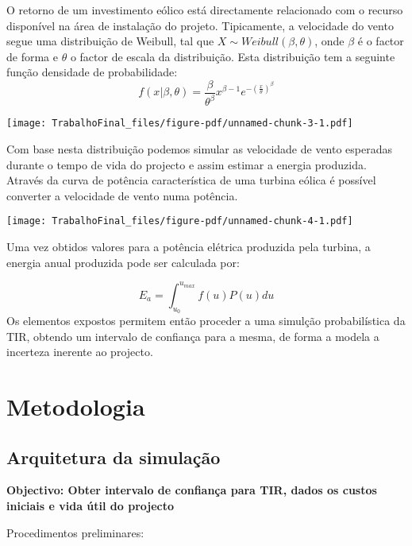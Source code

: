 \documentclass[
  letterpaper,
  DIV=11,
  numbers=noendperiod]{scrartcl}
\begin{document}
O retorno de um investimento eólico está directamente relacionado com o
recurso disponível na área de instalação do projeto. Tipicamente, a
velocidade do vento segue uma distribuição de Weibull, tal que
\(X \sim Weibull(\beta, \theta)\), onde \(\beta\) é o factor de forma e
\(\theta\) o factor de escala da distribuição. Esta distribuição tem a
seguinte função densidade de probabilidade: \[
f(x|{\beta, \theta}) = \frac{\beta}{\theta^\beta}x^{\beta-1}e^{-(\frac{x}{\theta})^\beta}
\]

\texttt{[image: TrabalhoFinal\_files/figure-pdf/unnamed-chunk-3-1.pdf]}

Com base nesta distribuição podemos simular as velocidade de vento
esperadas durante o tempo de vida do projecto e assim estimar a energia
produzida. Através da curva de potência característica de uma turbina
eólica é possível converter a velocidade de vento numa potência.

\texttt{[image: TrabalhoFinal\_files/figure-pdf/unnamed-chunk-4-1.pdf]}

Uma vez obtidos valores para a potência elétrica produzida pela turbina,
a energia anual produzida pode ser calculada por:

\[
E_a = \int^{u_{max}}_{u_0}f(u) P(u)du
\] Os elementos expostos permitem então proceder a uma simulção
probabilística da TIR, obtendo um intervalo de confiança para a mesma,
de forma a modela a incerteza inerente ao projecto.

\hypertarget{metodologia}{%
\section{Metodologia}\label{metodologia}}

\hypertarget{arquitetura-da-simulauxe7uxe3o}{%
\subsection{Arquitetura da
simulação}\label{arquitetura-da-simulauxe7uxe3o}}

\textbf{Objectivo: Obter intervalo de confiança para TIR, dados os
custos iniciais e vida útil do projecto}

Procedimentos preliminares:
\end{document}
